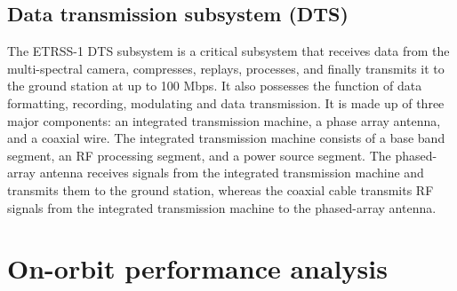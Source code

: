 \documentclass[final,5p,times,twocolumn]{elsarticle}
\begin{document}
\subsection{Data transmission subsystem (DTS)}
The ETRSS-1 DTS subsystem is a critical subsystem that receives data from the multi-spectral camera, compresses, replays, processes, and finally transmits it to the ground station at up to 100 Mbps. It also possesses the function of data formatting, recording, modulating and data transmission. It is made up of three major components: an integrated transmission machine, a phase array antenna, and a coaxial wire. The integrated transmission machine consists of a base band segment, an RF processing segment, and a power source segment. The phased-array antenna receives signals from the integrated transmission machine and transmits them to the ground station, whereas the coaxial cable transmits RF signals from the integrated transmission machine to the phased-array antenna.
\section{On-orbit performance analysis}
\end{document}
